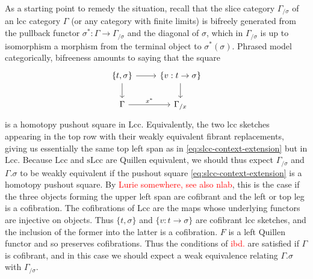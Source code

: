 \documentclass{article}
\newcommand{\todo}[1]{\textcolor{red}{#1}}
\begin{document}
As a starting point to remedy the situation, recall that the slice category $\Gamma_{/ \sigma}$ of an lcc category $\Gamma$ (or any category with finite limits) is bifreely generated from the pullback functor $\sigma^* : \Gamma \rightarrow \Gamma_{/ \sigma}$ and the diagonal of $\sigma$, which in $\Gamma_{/ \sigma}$ is up to isomorphism a morphism from the terminal object to $\sigma^*(\sigma)$.
Phrased model categorically, bifreeness amounts to saying that the square
\begin{equation}
  \label{eq:homotopy-pushout-lcc}
  \begin{tikzcd}
    \{ t, \sigma \} \arrow[r] \arrow[d] & \{ v : t \rightarrow \sigma \} \arrow[d] \\
    \Gamma \arrow[r, "x^*"] & \Gamma_{/ x}
  \end{tikzcd}
\end{equation}
is a homotopy pushout square in $\mathrm{Lcc}$.
Equivalently, the two lcc sketches appearing in the top row with their weakly equivalent fibrant replacements, giving us essentially the same top left span as in \eqref{eq:slcc-context-extension} but in $\mathrm{Lcc}$.
Because $\mathrm{Lcc}$ and $\mathrm{sLcc}$ are Quillen equivalent, we should thus expect $\Gamma_{/ \sigma}$ and $\Gamma.\sigma$ to be weakly equivalent if the pushout square \eqref{eq:slcc-context-extension} is a homotopy pushout square.
By \todo{Lurie somewhere, see also nlab}, this is the case if the three objects forming the upper left span are cofibrant and the left or top leg is a cofibration.
The cofibrations of $\mathrm{Lcc}$ are the maps whose underlying functors are injective on objects.
Thus $\{t, \sigma\}$ and $\{ v : t \rightarrow \sigma\}$ are cofibrant lcc sketches, and the inclusion of the former into the latter is a cofibration.
$F$ is a left Quillen functor and so preserves cofibrations.
Thus the conditions of \todo{ibd.} are satisfied if $\Gamma$ is cofibrant, and in this case we should expect a weak equivalence relating $\Gamma.\sigma$ with $\Gamma_{/ \sigma}$.
\end{document}
